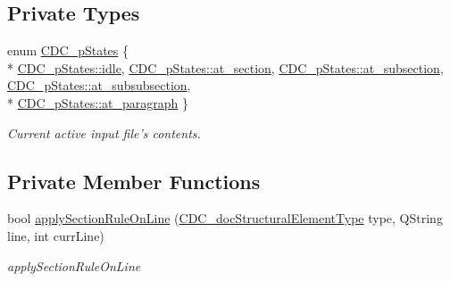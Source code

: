 \subsection*{Private Types}
\begin{DoxyCompactItemize}
\item 
enum \hyperlink{classinput_file_parser_afc7cd4c5ba9e85faf16c9a7b0fec3782}{C\+D\+C\+\_\+p\+States} \{ \\*
\hyperlink{classinput_file_parser_afc7cd4c5ba9e85faf16c9a7b0fec3782aec2f993aec2c27fc750119ab17b16cdb}{C\+D\+C\+\_\+p\+States\+::idle}, 
\hyperlink{classinput_file_parser_afc7cd4c5ba9e85faf16c9a7b0fec3782a12f1613ee9319cfdae1209e5608673fc}{C\+D\+C\+\_\+p\+States\+::at\+\_\+section}, 
\hyperlink{classinput_file_parser_afc7cd4c5ba9e85faf16c9a7b0fec3782a26df3654912116c869d7f61361778779}{C\+D\+C\+\_\+p\+States\+::at\+\_\+subsection}, 
\hyperlink{classinput_file_parser_afc7cd4c5ba9e85faf16c9a7b0fec3782aae921dba06eaa30a3e72e83ad1acfd6f}{C\+D\+C\+\_\+p\+States\+::at\+\_\+subsubsection}, 
\\*
\hyperlink{classinput_file_parser_afc7cd4c5ba9e85faf16c9a7b0fec3782a9588d5dfe50cd47cc712b45d681a4650}{C\+D\+C\+\_\+p\+States\+::at\+\_\+paragraph}
 \}
\begin{DoxyCompactList}\small\item\em Current active input file's contents. \end{DoxyCompactList}\end{DoxyCompactItemize}
\subsection*{Private Member Functions}
\begin{DoxyCompactItemize}
\item 
bool \hyperlink{classinput_file_parser_aede806deb50683f402a34b157b69869f}{apply\+Section\+Rule\+On\+Line} (\hyperlink{cdcdefs_8h_a6116ba1886594c273c61d425c61d6416}{C\+D\+C\+\_\+doc\+Structural\+Element\+Type} type, Q\+String line, int curr\+Line)
\begin{DoxyCompactList}\small\item\em apply\+Section\+Rule\+On\+Line \end{DoxyCompactList}\end{DoxyCompactItemize}
